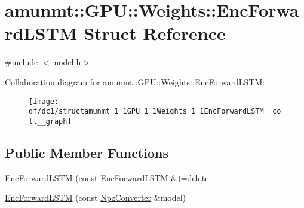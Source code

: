 \hypertarget{structamunmt_1_1GPU_1_1Weights_1_1EncForwardLSTM}{}\section{amunmt\+:\+:G\+PU\+:\+:Weights\+:\+:Enc\+Forward\+L\+S\+TM Struct Reference}
\label{structamunmt_1_1GPU_1_1Weights_1_1EncForwardLSTM}


{\ttfamily \#include $<$model.\+h$>$}



Collaboration diagram for amunmt\+:\+:G\+PU\+:\+:Weights\+:\+:Enc\+Forward\+L\+S\+TM\+:
\nopagebreak
\begin{figure}[H]
\begin{center}
\leavevmode
\texttt{[image: df/dc1/structamunmt\_1\_1GPU\_1\_1Weights\_1\_1EncForwardLSTM\_\_coll\_\_graph]}
\end{center}
\end{figure}
\subsection*{Public Member Functions}
\begin{DoxyCompactItemize}
\item 
\hyperlink{structamunmt_1_1GPU_1_1Weights_1_1EncForwardLSTM_a6974b1186e1afafe2593b8a74d62fdd6}{Enc\+Forward\+L\+S\+TM} (const \hyperlink{structamunmt_1_1GPU_1_1Weights_1_1EncForwardLSTM}{Enc\+Forward\+L\+S\+TM} \&)=delete
\item 
\hyperlink{structamunmt_1_1GPU_1_1Weights_1_1EncForwardLSTM_a65f4b436a59192e773f388c97149d30b}{Enc\+Forward\+L\+S\+TM} (const \hyperlink{classamunmt_1_1GPU_1_1NpzConverter}{Npz\+Converter} \&model)
\end{DoxyCompactItemize}
